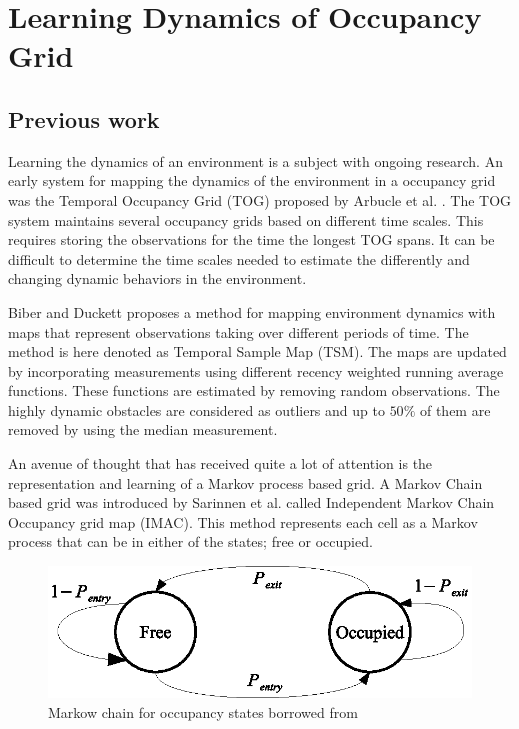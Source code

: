 \section{Learning Dynamics of Occupancy Grid}
\label{sec:learning_dynamics_of_env}

\subsection{Previous work}
Learning the dynamics of an environment is a subject with ongoing research.
An early system for mapping the dynamics of the environment in a occupancy grid was the Temporal Occupancy Grid (TOG) proposed by Arbucle et al. \cite{Arbuckle2002}. The TOG system maintains several occupancy grids based on different time scales. This requires storing the observations for the time the longest TOG spans. It can be difficult to determine the time scales needed to estimate the differently and changing dynamic behaviors in the environment.

Biber and Duckett \cite{Biber2005} proposes a method for mapping environment dynamics with maps that represent observations taking over different periods of time. The method is here denoted as Temporal Sample Map (TSM). The maps are updated by incorporating measurements using different recency weighted running average functions. These functions are estimated by removing random observations. The highly dynamic obstacles are considered as outliers and up to $50\%$ of them are removed by using the median measurement.

An avenue of thought that has received quite a lot of attention is the representation and learning of a Markov process based grid. A Markov Chain based grid was introduced by Sarinnen et al. \cite{Saarinen2012} called Independent Markov Chain Occupancy grid map (IMAC). This method represents each cell as a Markov process that can be in either of the states; free or occupied. 

\begin{figure}[tbph]
	\centering
	\includegraphics[width=0.7\linewidth]{chapters/mapping_of_dynamic_areas/figures/markow_occupancy_model}
	\caption{Markow chain for occupancy states borrowed from \cite{Saarinen2012}}
	\label{fig:markow_occupancy_model}
\end{figure}

